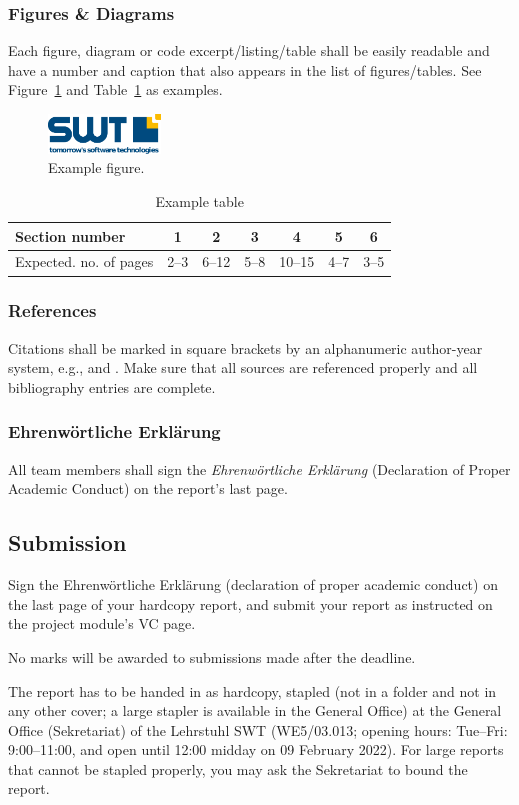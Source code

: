 \documentclass[a4paper,11pt,twoside]{article}
\newcommand\deadlinedate{09 February 2022}
\begin{document}
{\subsubsection*{Figures \& Diagrams}
Each figure, diagram or code excerpt/listing/table shall be easily readable and have a number and caption that also appears in the list of figures/tables. See Figure~\ref{fig:example} and Table~\ref{tab:example} as examples.

\begin{figure}[h]
  \centering
  \includegraphics[width=3cm]{resources/SWT-Logo}
  \caption{Example figure.}
  \label{fig:example}
\end{figure}

\begin{table}[h]
  \centering
  \caption{Example table}
  \begin{tabular}{|l||c|c|c|c|c|c|}
    \hline
    Section number & 1 & 2 & 3 & 4 & 5 & 6\\
    \hline
    Expected. no. of pages & 2--3 & 6--12 & 5--8 & 10--15 & 4--7 &3--5\\
    \hline
  \end{tabular}
  \label{tab:example}
\end{table}

\subsubsection*{References}
Citations shall be marked in square brackets by an alphanumeric author-year system, e.g., \cite{scrumbook,userstories} and \cite{texbook}. Make sure that all sources are referenced properly and all bibliography entries are complete.


\subsubsection*{Ehrenwörtliche Erklärung}
All team members shall sign the \emph{Ehrenwörtliche Erklärung} (Declaration of Proper Academic Conduct) on the report's last page.

\subsection*{Submission}
Sign the Ehrenwörtliche Erklärung (declaration of proper
academic conduct) on the last page of your hardcopy report, and submit 
your report as instructed on the project module's VC page.

No marks will be 
awarded to submissions made after the deadline.

The report has to be handed in as hardcopy, stapled (not in a folder
and not in any other cover; a large stapler is available in the General Office)
 at the General Office (Sekretariat) of the Lehrstuhl SWT
(WE5/03.013; opening hours: Tue--Fri: 9:00--11:00, and open until 12:00 midday
on \deadlinedate). For large reports that cannot be stapled properly, you may
ask the Sekretariat to bound the report.
}
\end{document}
